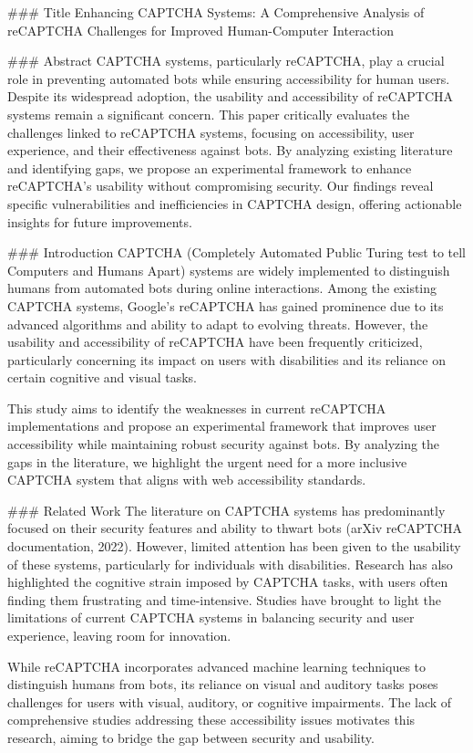 ### Title  
Enhancing CAPTCHA Systems: A Comprehensive Analysis of reCAPTCHA Challenges for Improved Human-Computer Interaction  

### Abstract  
CAPTCHA systems, particularly reCAPTCHA, play a crucial role in preventing automated bots while ensuring accessibility for human users. Despite its widespread adoption, the usability and accessibility of reCAPTCHA systems remain a significant concern. This paper critically evaluates the challenges linked to reCAPTCHA systems, focusing on accessibility, user experience, and their effectiveness against bots. By analyzing existing literature and identifying gaps, we propose an experimental framework to enhance reCAPTCHA's usability without compromising security. Our findings reveal specific vulnerabilities and inefficiencies in CAPTCHA design, offering actionable insights for future improvements.  

### Introduction  
CAPTCHA (Completely Automated Public Turing test to tell Computers and Humans Apart) systems are widely implemented to distinguish humans from automated bots during online interactions. Among the existing CAPTCHA systems, Google's reCAPTCHA has gained prominence due to its advanced algorithms and ability to adapt to evolving threats. However, the usability and accessibility of reCAPTCHA have been frequently criticized, particularly concerning its impact on users with disabilities and its reliance on certain cognitive and visual tasks.  

This study aims to identify the weaknesses in current reCAPTCHA implementations and propose an experimental framework that improves user accessibility while maintaining robust security against bots. By analyzing the gaps in the literature, we highlight the urgent need for a more inclusive CAPTCHA system that aligns with web accessibility standards.  

### Related Work  
The literature on CAPTCHA systems has predominantly focused on their security features and ability to thwart bots (arXiv reCAPTCHA documentation, 2022). However, limited attention has been given to the usability of these systems, particularly for individuals with disabilities. Research has also highlighted the cognitive strain imposed by CAPTCHA tasks, with users often finding them frustrating and time-intensive. Studies have brought to light the limitations of current CAPTCHA systems in balancing security and user experience, leaving room for innovation.  

While reCAPTCHA incorporates advanced machine learning techniques to distinguish humans from bots, its reliance on visual and auditory tasks poses challenges for users with visual, auditory, or cognitive impairments. The lack of comprehensive studies addressing these accessibility issues motivates this research, aiming to bridge the gap between security and usability.  

